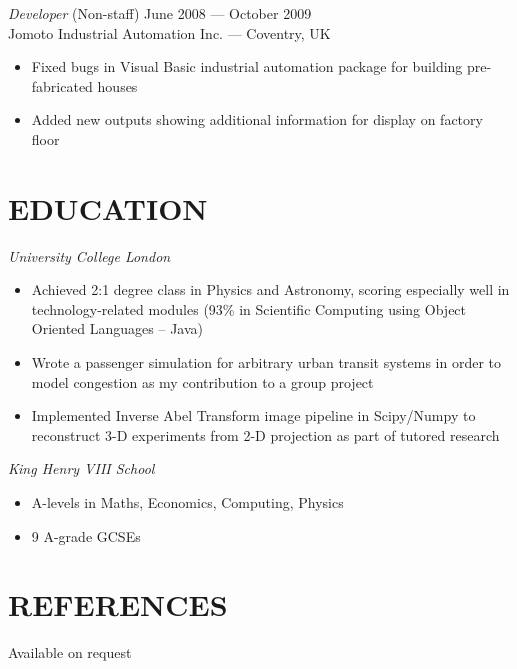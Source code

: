\documentclass[margin, 10pt]{res}
\begin{document}
\begin{resume}
{\sl Developer} \hfill (Non-staff) June 2008 --- October 2009 \\
Jomoto Industrial Automation Inc. --- Coventry, UK \\
\begin{itemize}
\item Fixed bugs in Visual Basic industrial automation package for building pre-fabricated houses
\item Added new outputs showing additional information for display on factory floor
\end{itemize}


\section{EDUCATION}

{\sl University College London} \\
\begin{itemize} \itemsep -2pt %
\item Achieved 2:1 degree class in Physics and Astronomy, scoring especially well in technology-related modules (93\% in Scientific Computing using Object Oriented Languages -- Java)
\item Wrote a passenger simulation for arbitrary urban transit systems in order to model congestion as my contribution to a group project
\item Implemented Inverse Abel Transform image pipeline in Scipy/Numpy to reconstruct 3-D experiments from 2-D projection as part of tutored research
\end{itemize}

{\sl King Henry VIII School} \\
\begin{itemize}
\item A-levels in Maths, Economics, Computing, Physics
\item 9 A-grade GCSEs
\end{itemize}

\section{REFERENCES}
Available on request

\end{resume}
\end{document}
